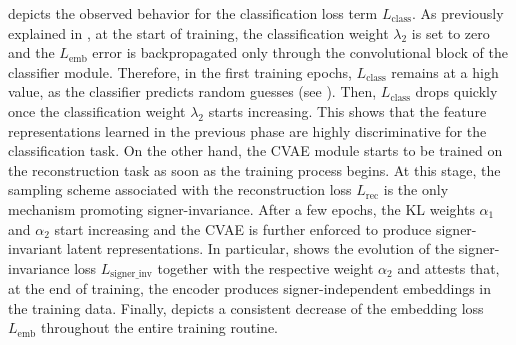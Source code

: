  depicts the observed behavior for the classification loss term $L_{\text{class}}$. As previously explained in , at the start of training, the classification weight $\lambda_{2}$ is set to zero and the $L_{\text{emb}}$ error is backpropagated only through the convolutional block of the classifier module. Therefore, in the first training epochs, $L_{\text{class}}$ remains at a high value, as the classifier predicts random guesses (see ). Then, $L_{\text{class}}$ drops quickly once the classification weight $\lambda_{2}$ starts increasing. This shows that the feature representations learned in the previous phase are highly discriminative for the classification task. On the other hand, the CVAE module starts to be trained on the reconstruction task as soon as the training process begins. At this stage, the sampling scheme associated with the reconstruction loss $L_{\text{rec}}$ is the only mechanism promoting signer-invariance. After a few epochs, the KL weights $\alpha_1$ and $\alpha_2$ start increasing and the CVAE is further enforced to produce signer-invariant latent representations. In particular,  shows the evolution of the signer-invariance loss $L_{\text{signer\_inv}}$ together with the respective weight $\alpha_2$ and attests that, at the end of training, the encoder produces signer-independent embeddings in the training data. Finally,  depicts a consistent decrease of the embedding loss $L_{\text{emb}}$ throughout the entire training routine.

